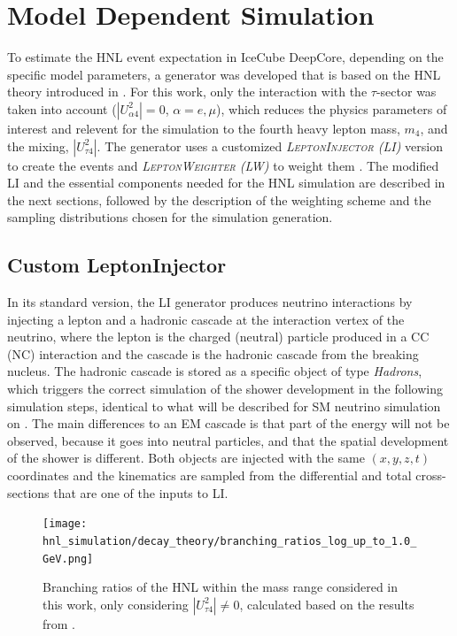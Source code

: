 \section{Model Dependent Simulation} 

To estimate the HNL event expectation in IceCube DeepCore, depending on the specific model parameters, a generator was developed that is based on the HNL theory introduced in . For this work, only the interaction with the $\tau$-sector was taken into account ($|U_{\alpha4}^2|=0$, $\alpha=e,\mu$), which reduces the physics parameters of interest and relevent for the simulation to the fourth heavy lepton mass, $m_4$, and the mixing, $|U_{\tau4}^2|$. The generator uses a customized \textit{\textsc{LeptonInjector} (LI)} version to create the events and \textit{\textsc{LeptonWeighter} (LW)} to weight them . The modified LI and the essential components needed for the HNL simulation are described in the next sections, followed by the description of the weighting scheme and the sampling distributions chosen for the simulation generation.


\subsection{Custom LeptonInjector} 

In its standard version, the LI generator produces neutrino interactions by injecting a lepton and a hadronic cascade at the interaction vertex of the neutrino, where the lepton is the charged (neutral) particle produced in a CC (NC) interaction and the cascade is the hadronic cascade from the breaking nucleus. The hadronic cascade is stored as a specific object of type \textit{Hadrons}, which triggers the correct simulation of the shower development in the following simulation steps, identical to what will be described for SM neutrino simulation on . The main differences to an EM cascade is that part of the energy will not be observed, because it goes into neutral particles, and that the spatial development of the shower is different. Both objects are injected with the same $(x,y,z,t)$ coordinates and the kinematics are sampled from the differential and total cross-sections that are one of the inputs to LI.

\begin{figure}[h]
    \texttt{[image: hnl\_simulation/decay\_theory/branching\_ratios\_log\_up\_to\_1.0\_GeV.png]}
    \caption[HNL branching ratios]{Branching ratios of the HNL within the mass range considered in this work, only considering $|U_{\tau4}^2| \neq 0$, calculated based on the results from \cite{Coloma:2020lgy}.}
\end{figure}

